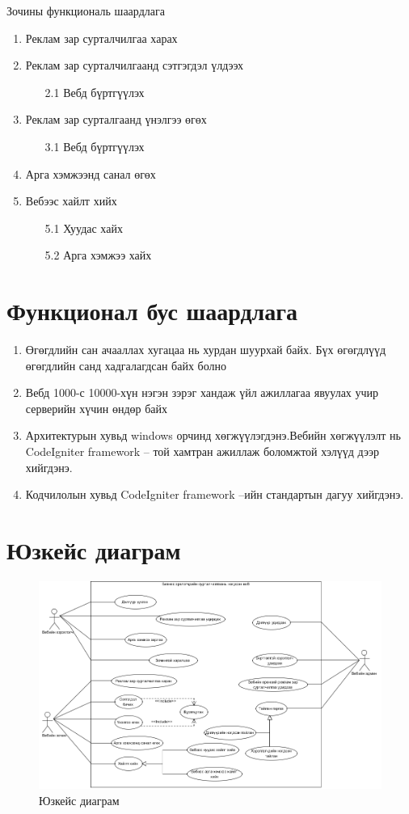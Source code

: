 Зочины функциональ шаардлага
\begin{enumerate}
	\item Реклам зар сурталчилгаа харах
	\item Реклам зар сурталчилгаанд сэтгэгдэл үлдээх
	\begin{enumerate}
		\item[2.1] Вебд бүртгүүлэх
	\end{enumerate}	
	
	\item Реклам зар сурталгаанд үнэлгээ өгөх
	\begin{enumerate}
		\item[3.1] Вебд бүртгүүлэх
	\end{enumerate}	
	
	\item Арга хэмжээнд санал өгөх
	\item Вебээс хайлт хийх
	\begin{enumerate}
		\item[5.1] Хуудас хайх
		\item[5.2] Арга хэмжээ хайх
	\end{enumerate}
\end{enumerate}
\section{Функционал бус шаардлага}
\begin{enumerate}
	\item Өгөгдлийн сан ачааллах хугацаа нь хурдан шуурхай байх. Бүх өгөгдлүүд өгөгдлийн санд хадгалагдсан байх болно
	\item Вебд 1000-с 10000-хүн нэгэн зэрэг хандаж үйл ажиллагаа явуулах учир серверийн хүчин өндөр байх
	\item Архитектурын хувьд windows орчинд хөгжүүлэгдэнэ.Вебийн хөгжүүлэлт нь CodeIgniter framework – той хамтран ажиллаж боломжтой хэлүүд дээр хийгдэнэ.
	\item Кодчилолын хувьд CodeIgniter framework –ийн стандартын дагуу хийгдэнэ.
\end{enumerate}
\section{Юзкейс диаграм}
\begin{figure}[htbp]
	\centering
	\includegraphics[scale=0.4]{Diagrams/UseCase}
	\caption[Юзкейс диаграм]{Юзкейс диаграм}
	\label{fit:UseCase}
\end{figure}
